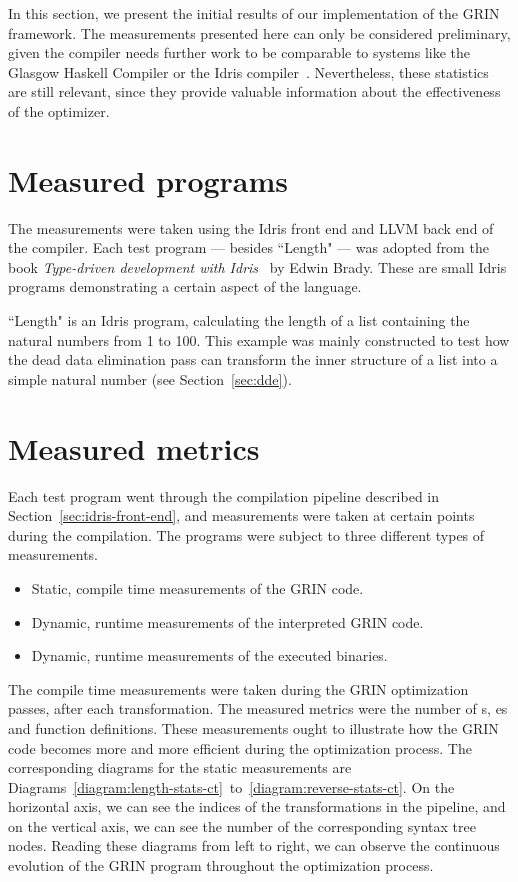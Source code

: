 \documentclass[main.tex]{subfiles}
\begin{document}
	
	In this section, we present the initial results of our implementation of the GRIN framework. The measurements presented here can only be considered preliminary, given the compiler needs further work to be comparable to systems like the Glasgow Haskell Compiler or the Idris compiler~\cite{idris}. Nevertheless, these statistics are still relevant, since they provide valuable information about the effectiveness of the optimizer.
	
	\section{Measured programs}
	
	The measurements were taken using the Idris front end and LLVM back end of the compiler. Each test program --- besides ``Length" --- was adopted from the book \textit{Type-driven development with Idris}~\cite{tdd-idris} by Edwin Brady. These are small Idris programs demonstrating a certain aspect of the language.
	
	``Length" is an Idris program, calculating the length of a list containing the natural numbers from 1 to 100. This example was mainly constructed to test how the dead data elimination pass can transform the inner structure of a list into a simple natural number (see Section~\ref{sec:dde}).
	
	\section{Measured metrics}
	
	Each test program went through the compilation pipeline described in Section~\ref{sec:idris-front-end}, and measurements were taken at certain points during the compilation. The programs were subject to three different types of measurements.
	
	\vspace{0.25cm}
	\begin{itemize}
		\item Static, compile time measurements of the GRIN code.
		\item Dynamic, runtime measurements of the interpreted GRIN code.
		\item Dynamic, runtime measurements of the executed binaries.
	\end{itemize}
	\vspace{0.25cm}

	The compile time measurements were taken during the GRIN optimization passes, after each transformation. The measured metrics were the number of s, es and function definitions. These measurements ought to illustrate how the GRIN code becomes more and more efficient during the optimization process. The corresponding diagrams for the static measurements are Diagrams~\ref{diagram:length-stats-ct}~to~\ref{diagram:reverse-stats-ct}. On the horizontal axis, we can see the indices of the transformations in the pipeline, and on the vertical axis, we can see the number of the corresponding syntax tree nodes. Reading these diagrams from left to right, we can observe the continuous evolution of the GRIN program throughout the optimization process.
	
\end{document}
